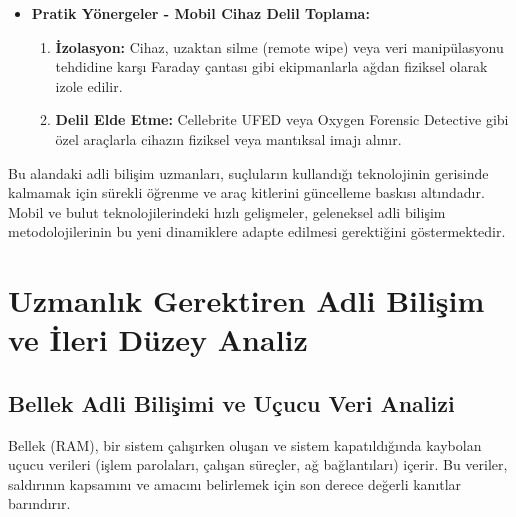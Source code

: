 \begin{itemize}
\begin{itemize}
    \item \textbf{Pratik Yönergeler - Mobil Cihaz Delil Toplama:}
    \begin{enumerate}
        \item \textbf{İzolasyon:} Cihaz, uzaktan silme (remote wipe) veya veri manipülasyonu tehdidine karşı Faraday çantası gibi ekipmanlarla ağdan fiziksel olarak izole edilir.
        \item \textbf{Delil Elde Etme:} Cellebrite UFED veya Oxygen Forensic Detective gibi özel araçlarla cihazın fiziksel veya mantıksal imajı alınır.
    \end{enumerate}
\end{itemize}
Bu alandaki adli bilişim uzmanları, suçluların kullandığı teknolojinin gerisinde kalmamak için sürekli öğrenme ve araç kitlerini güncelleme baskısı altındadır. Mobil ve bulut teknolojilerindeki hızlı gelişmeler, geleneksel adli bilişim metodolojilerinin bu yeni dinamiklere adapte edilmesi gerektiğini göstermektedir.

\section{Uzmanlık Gerektiren Adli Bilişim ve İleri Düzey Analiz}

\subsection{Bellek Adli Bilişimi ve Uçucu Veri Analizi}

Bellek (RAM), bir sistem çalışırken oluşan ve sistem kapatıldığında kaybolan uçucu verileri (işlem parolaları, çalışan süreçler, ağ bağlantıları) içerir. Bu veriler, saldırının kapsamını ve amacını belirlemek için son derece değerli kanıtlar barındırır.


\end{itemize}
